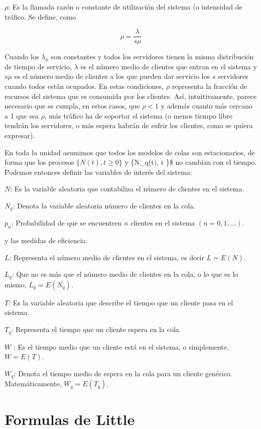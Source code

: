 \documentclass[
]{book}
\theoremstyle{definition}
\theoremstyle{definition}
\theoremstyle{definition}
\theoremstyle{definition}
\theoremstyle{remark}
\begin{document}
\textbf{\(\rho\)}: Es la llamada razón o constante de utilización del sistema (o intensidad de tráfico. Se define, como

\[\rho = \frac{\lambda}{s\mu}\]

Cuando los \(\lambda_n\) son constantes y todos los servidores tienen la misma distribución de tiempo de servicio, \(\lambda\) es el número medio de clientes que entran en el sistema y \(s\mu\) es el número medio de clientes a los que pueden dar servicio los \(s\) servidores cuando todos están ocupados. En estas condiciones, \(\rho\) representa la fracción de recursos del sistema que es consumida por los clientes. Así, intuitivamente, parece necesario que se cumpla, en estos casos, que \(\rho < 1\) y además cuanto más cercano a 1 que sea \(\rho\), más tráfico ha de soportar el sistema (o menos tiempo libre tendrán los servidores, o más espera habrán de sufrir los clientes, como se quiera expresar).

En toda la unidad asumimos que todos los modelos de colas son estacionarios, de forma que los procesos \(\{N(t), t \geq 0\}\) y \{N\_q(t), t \}\$ no cambían con el tiempo. Podemos entonces definir las variables de interés del sistema:

\textbf{\(N\)}: Es la variable aleatoria que contabiliza el número de clientes en el sistema.

\textbf{\(N_q\)}: Denota la variable aleatoria número de clientes en la cola.

\textbf{\(p_n\)}: Probabilidad de que se encuentren \(n\) clientes en el sistema \((n = 0, 1,... )\).

y las medidas de eficiencia:

\textbf{\(L\)}: Representa el número medio de clientes en el sistema, es decir \(L = E(N)\).

\textbf{\(L_q\)}: Que no es más que el número medio de clientes en la cola, o lo que es lo mismo, \(L_q = E(N_q)\).

\textbf{\(T\)}: Es la variable aleatoria que describe el tiempo que un cliente pasa en el sistema.

\textbf{\(T_q\)}: Representa el tiempo que un cliente espera en la cola.

\textbf{\(W\)} : Es el tiempo medio que un cliente está en el sistema, o simplemente, \(W = E(T)\).

\textbf{\(W_q\)}: Denota el tiempo medio de espera en la cola para un cliente genérico. Matemáticamente, \(W_q = E(T_q)\).

\hypertarget{COLASB}{%
\section{Formulas de Little}\label{COLASB}}
\end{document}
